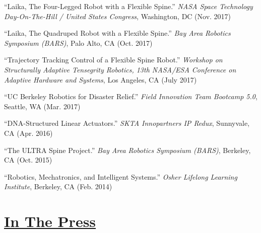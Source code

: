 \documentclass[letterpaper]{deedy-resume} %
\begin{document}
\begin{etaremune}[itemsep=0.1cm]
\item ``Laika, The Four-Legged Robot with a Flexible Spine.'' {\it NASA Space Technology Day-On-The-Hill / United States Congress}, Washington, DC (Nov. 2017)

\item ``Laika, The Quadruped Robot with a Flexible Spine.'' {\it Bay Area Robotics Symposium (BARS)}, Palo Alto, CA (Oct. 2017)

\item ``Trajectory Tracking Control of a Flexible Spine Robot.'' {\it Workshop on Structurally Adaptive Tensegrity Robotics, 13th NASA/ESA Conference on Adaptive Hardware and Systems}, Los Angeles, CA (July 2017)

\item ``UC Berkeley Robotics for Disaster Relief.'' {\it Field Innovation Team Bootcamp 5.0}, Seattle, WA (Mar. 2017)

\item ``DNA-Structured Linear Actuators.'' {\it  SKTA Innopartners IP Redux}, Sunnyvale, CA (Apr. 2016)

\item ``The ULTRA Spine Project.'' {\it Bay Area Robotics Symposium (BARS)}, Berkeley, CA (Oct. 2015)

\item ``Robotics, Mechatronics, and Intelligent Systems.'' {\it Osher Lifelong Learning Institute}, Berkeley, CA (Feb. 2014)

 \end{etaremune}



\section{\underline{In The Press}}
\vspace{0.2cm}
\end{document}
